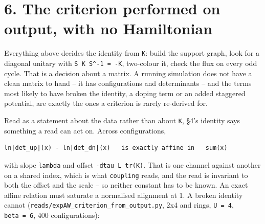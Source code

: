 \documentclass[10pt,letterpaper,twocolumn]{article}
\begin{document}
\section{6. The criterion performed on output, with no Hamiltonian}\label{6-the-criterion-performed-on-output-with-no-hamiltonian}

Everything above decides the identity from \texttt{K}: build the support graph, look for a diagonal
unitary with \texttt{S\ K\ S\^{}-{}\allowbreak{}1\ =\allowbreak{}\ -{}\allowbreak{}K}, two-colour it, check the flux on every odd cycle. That is a decision
about a matrix. A running simulation does not have a clean matrix to hand -- it has configurations
and determinants -- and the terms most likely to have broken the identity, a doping term or an
added staggered potential, are exactly the ones a criterion is rarely re-derived for.

Read as a statement about the data rather than about \texttt{K}, §4's identity says something a read can
act on. Across configurations,

\begin{verbatim}
ln|det_up|(x) - ln|det_dn|(x)   is exactly affine in   sum(x)
\end{verbatim}

with slope \texttt{lambda} and offset \texttt{-{}\allowbreak{}dtau\ L\ tr(\allowbreak{}K)\allowbreak{}}. That is one channel against another on a shared
index, which is what \texttt{coupling} reads, and the read is invariant to both the offset and the scale --
so neither constant has to be known. An exact affine relation must saturate a normalised alignment
at 1. A broken identity cannot (\texttt{reads/\allowbreak{}expAW\_\allowbreak{}criterion\_\allowbreak{}from\_\allowbreak{}output.\allowbreak{}py}, 2x4 and rings, \texttt{U\ =\allowbreak{}\ 4},
\texttt{beta\ =\allowbreak{}\ 6}, 400 configurations):

\end{document}
